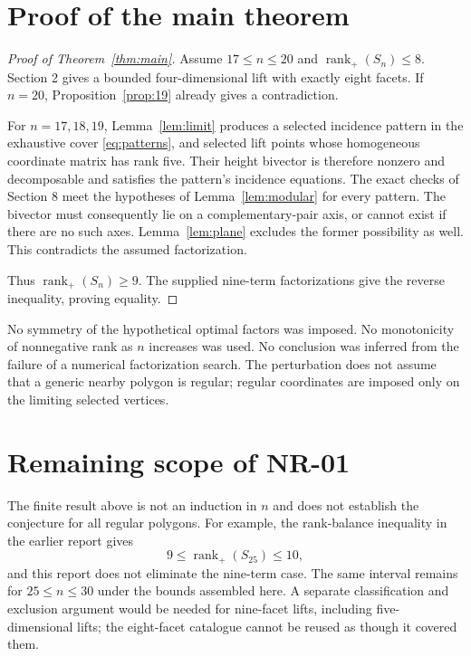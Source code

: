 \documentclass[11pt]{article}
\theoremstyle{definition}
\newcommand{\rankp}{\operatorname{rank}_{+}}
\begin{document}
\section{Proof of the main theorem}
\begin{proof}[Proof of Theorem~\ref{thm:main}]
Assume $17\le n\le20$ and $\rankp(S_n)\le8$. Section 2 gives a bounded four-dimensional lift with exactly eight facets. If $n=20$, Proposition~\ref{prop:19} already gives a contradiction.

For $n=17,18,19$, Lemma~\ref{lem:limit} produces a selected incidence pattern in the exhaustive cover \eqref{eq:patterns}, and selected lift points whose homogeneous coordinate matrix has rank five. Their height bivector is therefore nonzero and decomposable and satisfies the pattern's incidence equations. The exact checks of Section 8 meet the hypotheses of Lemma~\ref{lem:modular} for every pattern. The bivector must consequently lie on a complementary-pair axis, or cannot exist if there are no such axes. Lemma~\ref{lem:plane} excludes the former possibility as well. This contradicts the assumed factorization.

Thus $\rankp(S_n)\ge9$. The supplied nine-term factorizations give the reverse inequality, proving equality.
\end{proof}

No symmetry of the hypothetical optimal factors was imposed. No monotonicity of nonnegative rank as $n$ increases was used. No conclusion was inferred from the failure of a numerical factorization search. The perturbation does not assume that a generic nearby polygon is regular; regular coordinates are imposed only on the limiting selected vertices.

\section{Remaining scope of NR-01}
The finite result above is not an induction in $n$ and does not establish the conjecture for all regular polygons. For example, the rank-balance inequality in the earlier report gives
\[
 9\le\rankp(S_{25})\le10,
\]
and this report does not eliminate the nine-term case. The same interval remains for $25\le n\le30$ under the bounds assembled here. A separate classification and exclusion argument would be needed for nine-facet lifts, including five-dimensional lifts; the eight-facet catalogue cannot be reused as though it covered them.
\end{document}
